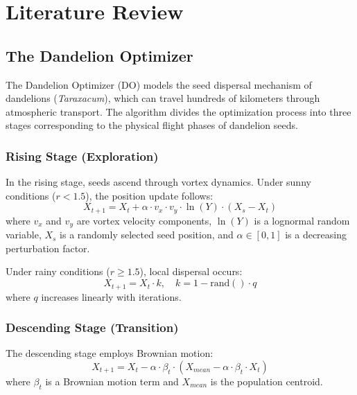 \documentclass[preprint,12pt]{elsarticle}
\begin{document}
\section{Literature Review}
\label{sec:literature}

\subsection{The Dandelion Optimizer}
\label{subsec:do}

The Dandelion Optimizer (DO) \cite{zhao2022dandelion} models the seed dispersal mechanism of dandelions (\textit{Taraxacum}), which can travel hundreds of kilometers through atmospheric transport. The algorithm divides the optimization process into three stages corresponding to the physical flight phases of dandelion seeds.

\subsubsection{Rising Stage (Exploration)}
In the rising stage, seeds ascend through vortex dynamics. Under sunny conditions ($r < 1.5$), the position update follows:
\begin{equation}
X_{t+1} = X_t + \alpha \cdot v_x \cdot v_y \cdot \ln(Y) \cdot (X_s - X_t)
\label{eq:rising_sunny}
\end{equation}
where $v_x$ and $v_y$ are vortex velocity components, $\ln(Y)$ is a lognormal random variable, $X_s$ is a randomly selected seed position, and $\alpha \in [0,1]$ is a decreasing perturbation factor.

Under rainy conditions ($r \geq 1.5$), local dispersal occurs:
\begin{equation}
X_{t+1} = X_t \cdot k, \quad k = 1 - \text{rand}() \cdot q
\label{eq:rising_rainy}
\end{equation}
where $q$ increases linearly with iterations.

\subsubsection{Descending Stage (Transition)}
The descending stage employs Brownian motion:
\begin{equation}
X_{t+1} = X_t - \alpha \cdot \beta_t \cdot (X_{mean} - \alpha \cdot \beta_t \cdot X_t)
\label{eq:descending}
\end{equation}
where $\beta_t$ is a Brownian motion term and $X_{mean}$ is the population centroid.
\end{document}
